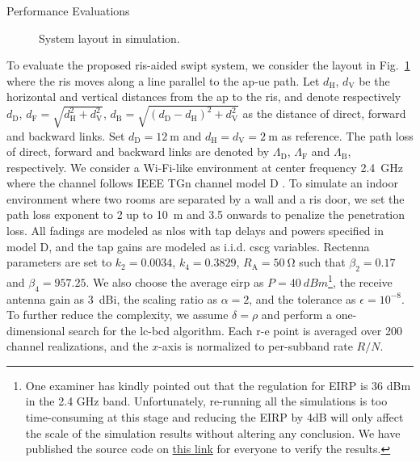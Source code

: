 \begin{section}{Performance Evaluations}\label{sc:performance_evaluation}
	\begin{figure}[H]
		\centering
		\def\svgwidth{0.9\columnwidth}
		
		\caption{System layout in simulation.}
		\label{fg:layout}
	\end{figure}

	To evaluate the proposed \gls{ris}-aided \gls{swipt} system, we consider the layout in Fig.~\ref{fg:layout} where the \gls{ris} moves along a line parallel to the \gls{ap}-\gls{ue} path. Let $d_{\mathrm{H}}$, $d_{\mathrm{V}}$ be the horizontal and vertical distances from the \gls{ap} to the \gls{ris}, and denote respectively $d_{\mathrm{D}}$, $d_{\mathrm{F}}=\sqrt{d_{\mathrm{H}}^2+d_{\mathrm{V}}^2}$, $d_{\mathrm{B}}=\sqrt{(d_{\mathrm{D}}-d_{\mathrm{H}})^2+d_{\mathrm{V}}^2}$ as the distance of direct, forward and backward links. Set $d_{\mathrm{D}}=\qty{12}{\meter}$ and $d_{\mathrm{H}}=d_{\mathrm{V}}=\qty{2}{\meter}$ as reference. The path loss of direct, forward and backward links are denoted by $\Lambda_{\mathrm{D}}$, $\Lambda_{\mathrm{F}}$ and $\Lambda_{\mathrm{B}}$, respectively. We consider a Wi-Fi-like environment at center frequency \qty{2.4}{\GHz} where the channel follows IEEE TGn channel model D \cite{Erceg2004}. To simulate an indoor environment where two rooms are separated by a wall and a \gls{ris} door, we set the path loss exponent to \num{2} up to \qty{10}{\meter} and \num{3.5} onwards to penalize the penetration loss. All fadings are modeled as \gls{nlos} with tap delays and powers specified in model D, and the tap gains are modeled as i.i.d. \gls{cscg} variables. Rectenna parameters are set to $k_2=0.0034$, $k_4=0.3829$, $R_{\mathrm{A}}=\qty{50}{\ohm}$ \cite{Clerckx2016a} such that $\beta_2=0.17$ and $\beta_4=957.25$. We also choose the average \gls{eirp} as $P=\qty{40}{dBm}$\footnote{One examiner has kindly pointed out that the regulation for EIRP is 36 dBm in the 2.4 GHz band. Unfortunately, re-running all the simulations is too time-consuming at this stage and reducing the EIRP by 4dB will only affect the scale of the simulation results without altering any conclusion. We have published the source code on \href{https://github.com/snowztail/irs-aided-swipt-joint-waveform-active-and-passive-beamforming-design-under-nonlinear-harvester-model}{this link} for everyone to verify the results.}, the receive antenna gain as \qty{3}{dBi}, the scaling ratio as $\alpha=2$, and the tolerance as $\epsilon=10^{-8}$. To further reduce the complexity, we assume $\delta=\rho$ and perform a one-dimensional search for the \gls{lc}-\gls{bcd} algorithm. Each \gls{r-e} point is averaged over \num{200} channel realizations, and the $x$-axis is normalized to per-subband rate $R/N$.


\end{section}
